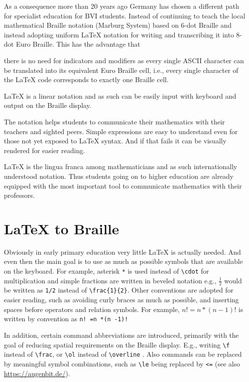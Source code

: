 \documentclass{easychair}
\begin{document}
As a consequence more than 20 years ago Germany has chosen a different path for
specialist education for BVI students. Instead of continuing to teach the local
mathematical Braille notation (Marburg System) based on 6-dot Braille and instead
adopting uniform {\LaTeX} notation for writing and transcribing it into 8-dot
Euro Braille. This has the advantage that 
\begin{inparaenum}[(1)]
\item there is no need for indicators and
  modifiers as every single ASCII character can be translated into its equivalent
  Euro Braille cell, i.e., every single character of the {\LaTeX} code corresponds
  to exactly one Braille cell.
\item {\LaTeX} is a linear notation and as such can be easily input with
  keyboard and output on the Braille display.
\item The notation helps students to communicate their mathematics with their
  teachers and sighted peers. Simple expressions are easy to understand even for
  those not yet exposed to {\LaTeX} syntax. And if that fails it can be visually
  rendered for easier reading.
\item {\LaTeX} is the lingua franca among mathematicians and as such
  internationally understood notation. Thus students going on to higher
  education are already equipped with the most important tool to communicate
  mathematics with their professors.
\end{inparaenum}


\section{{\LaTeX} to Braille}\label{sec:latex-to-braille}

Obviously in early primary education very little {\LaTeX} is actually
needed. And even then the main goal is to use as much as possible symbols that are
available on the keyboard. For example, asterisk \texttt{*} is used instead of
\verb+\cdot+ for multiplication and simple fractions are written in beveled
notation e.g., $\frac{1}{2}$ would be written as \texttt{1/2} instead of
\verb+\frac{1}{2}+. Other conventions are adopted for easier reading, such as
avoiding curly braces as much as possible, and inserting spaces before operators
and relation symbols. For example, ${ n! = n*(n-1)! }$ is written by convention
as \verb+n! =n *(n -1)!+

In addition, certain command abbreviations are introduced, primarily with the
goal of reducing spatial requirements on the Braille display. E.g., writing
\verb+\f+ instead of \verb+\frac+, or \verb+\ol+ instead of \verb+\overline+
. Also commands can be replaced by meaningful symbol combinations, such as
\verb+\le+ being replaced by \verb+<=+  (see also \url{https://augenbit.de/}).
\end{document}
